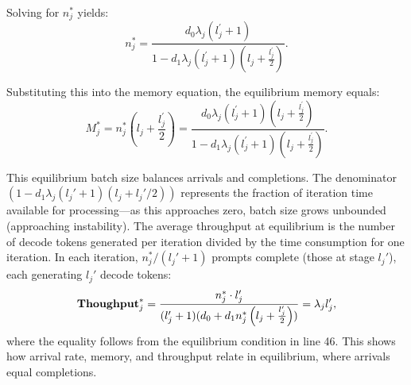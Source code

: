 Solving for $n_j^*$ yields:
$$n_j^* = \frac{d_0\lambda_j(l_j^{\prime}+1)}{1-d_1\lambda_j(l_j^{\prime}+1)(l_j+\frac{l_j^{\prime}}{2})}.$$

Substituting this into the memory equation, the equilibrium memory equals:
\begin{equation}
    \label{eq:memory_single}
M_j^* = n_j^*\left( l_j+\frac{l_j^{\prime}}{2} \right)
=  \frac{d_0\lambda_j(l_j^{\prime}+1)\left( l_j+\frac{l_j^{\prime}}{2} \right) }{1-d_1\lambda_j(l_j^{\prime}+1)(l_j+\frac{l_j^{\prime}}{2})}.
\end{equation}

This equilibrium batch size balances arrivals and completions. The denominator $\left(1 - d_1\lambda_j(l_j'+1)(l_j + l_j'/2)\right)$ represents the fraction of iteration time available for processing---as this approaches zero, batch size grows unbounded (approaching instability).
The average throughput at equilibrium is the number of decode tokens generated per iteration divided by the time consumption for one iteration. In each iteration, $n_j^*/(l_j'+1)$ prompts complete (those at stage $l_j'$), each generating $l_j'$ decode tokens:
\begin{equation}\label{eq:throughput_fluid}
\textbf{Thoughput}_j^* = \frac{n_j^* \cdot l_j'}{(l_j'+1)(d_0+d_1n_j^*\left({l_j+\frac{l_j'}{2}}\right))} = \lambda_j l_j',
\end{equation}
where the equality follows from the equilibrium condition in line 46. This shows how arrival rate, memory, and throughput relate in equilibrium, where arrivals equal completions.

